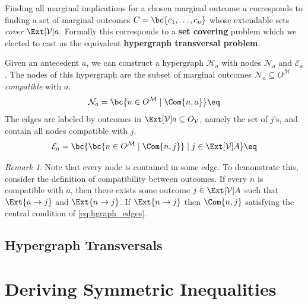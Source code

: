\documentclass[aps, 10pt, english, twoside, pra, nofootinbib, longbibliography]{revtex4-1}
\theoremstyle{plain}
\theoremstyle{definition}
\theoremstyle{remark}
\newtheorem{remark}[theorem]{Remark}
\newcommand{\hgraph}{\mathcal{H}}
\newcommand{\nodes}{\mathcal{N}}
\newcommand{\edges}{\mathcal{E}}
\newcommand{\term}[1]{\textcolor{Mahogany}{\textbf{#1}}}
\begin{document}

    Finding all marginal implications for a chosen marginal outcome $a$ corresponds to finding a set of marginal outcomes $C = \bc{c_1, \ldots, c_n}$ whose extendable sets \textit{cover} $\Ext[\mathcal{V}]{a}$. Formally this corresponds to a \term{set covering} problem  which we elected to cast as the equivalent \term{hypergraph transversal problem}.


    Given an antecedent $a$, we can construct a hypergraph $\hgraph_{a}$ with nodes $\nodes_a$ and $\edges_a$. The nodes of this hypergraph are the subset of marginal outcomes $\nodes_a \subseteq O^{\mathcal{M}}$ \textit{compatible} with $a$.
    \[ \nodes_a = \bc{n \in O^{\mathcal{M}} \mid \Com{n, a}} \eq \label{eq:hgraph_nodes}\]
    The edges are labeled by outcomes in $\Ext[\mathcal{V}]{a} \subseteq O_{\mathcal{V}}$, namely the set of $j$'s, and contain all nodes compatible with $j$.
    \[ \edges_a = \bc{\bc{n \in O^{\mathcal{M}} \mid \Com{n, j}} \mid j \in \Ext[\mathcal{V}]{A}} \eq \label{eq:hgraph_edges} \]
    \begin{remark}
        Note that every node is contained in some edge. To demonstrate this, consider the definition of compatibility between outcomes. If every $n$ is compatible with $a$, then there exists some outcome $j \in \Ext[\mathcal{V}]{A}$ such that $\Ext{a \to j}$ and $\Ext{n \to j}$. If $\Ext{n \to j}$ then $\Com{n, j}$ satisfying the central condition of \cref{eq:hgraph_edges}.
    \end{remark}


    \subsection{Hypergraph Transversals}
    \section{Deriving Symmetric Inequalities}
\end{document}
